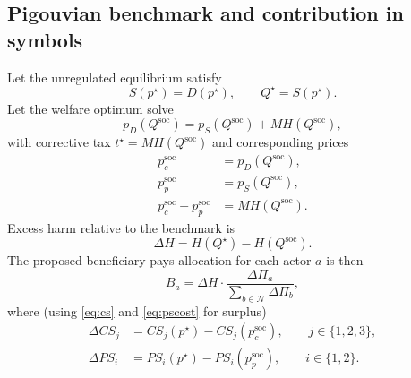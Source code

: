 \documentclass[journal, a4paper]{IEEEtran}
\begin{document}
\subsection{Pigouvian benchmark and contribution in symbols}
Let the unregulated equilibrium satisfy
\begin{equation}
S(p^\star)=D(p^\star),\qquad Q^\star=S(p^\star).
\end{equation}
Let the welfare optimum solve
\begin{equation}
p_D(Q^{\text{soc}})=p_S(Q^{\text{soc}})+MH(Q^{\text{soc}}),
\end{equation}
with corrective tax $t^\star=MH(Q^{\text{soc}})$ and corresponding prices
\begin{align}
p_c^{\text{soc}}&=p_D(Q^{\text{soc}}),\\ p_p^{\text{soc}}&=p_S(Q^{\text{soc}}),\\
p_c^{\text{soc}}-p_p^{\text{soc}}&=MH(Q^{\text{soc}}).
\end{align}
Excess harm relative to the benchmark is
\begin{equation}
\Delta H = H(Q^\star)-H(Q^{\text{soc}}).
\end{equation}
The proposed beneficiary-pays allocation for each actor $a$ is then
\begin{equation}
B_a=\Delta H\cdot \frac{\Delta \Pi_a}{\sum_{b\in \mathcal{N}} \Delta \Pi_b},
\end{equation}
where (using \eqref{eq:cs} and \eqref{eq:pscost} for surplus)
\begin{align}
\Delta CS_j &= CS_j(p^\star)-CS_j(p_c^{\text{soc}}),\qquad j\in\{1,2,3\},\\
\Delta PS_i &= PS_i(p^\star)-PS_i(p_p^{\text{soc}}),\qquad i\in\{1,2\}.
\end{align}
\end{document}
